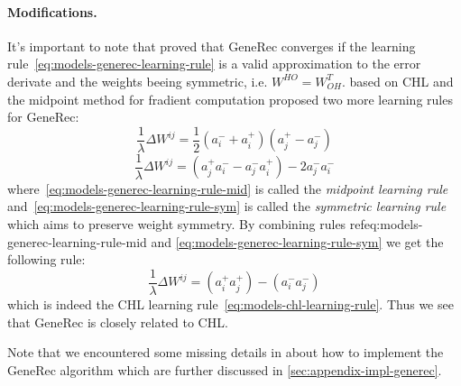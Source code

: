\paragraph{Modifications.}
It's important to note that \citet{o1996bio} proved that GeneRec converges if the learning rule~\ref{eq:models-generec-learning-rule} is a valid approximation to the error derivate and the weights beeing symmetric, i.e. $W^{HO} = W^{T}_{OH}$. \citet{o1996bio} based on CHL and the midpoint method for fradient computation \citep{press1990numerical} proposed two more learning rules for GeneRec: 
\begin{equation}
  \label{eq:models-generec-learning-rule-mid}
  \frac{1}{\lambda} \Delta W^{ij} =  \frac{1}{2}(a^{-}_i + a^{+}_i)(a^{+}_j - a^{-}_j)
\end{equation}
\begin{equation}
  \label{eq:models-generec-learning-rule-sym}
  \frac{1}{\lambda} \Delta W^{ij} =  (a^{+}_j a^{-}_i - a^{-}_j a^{+}_i) - 2a^{-}_j a^{-}_i
\end{equation}
where~\ref{eq:models-generec-learning-rule-mid} is called the \emph{midpoint learning rule} and~\ref{eq:models-generec-learning-rule-sym} is called the \emph{symmetric learning rule} which aims to preserve weight symmetry. By combining rules ref{eq:models-generec-learning-rule-mid} and \ref{eq:models-generec-learning-rule-sym} we get the following rule: 
\begin{equation}
  \label{eq:models-generec-learning-rule-chl}
  \frac{1}{\lambda} \Delta W^{ij} =  (a^{+}_i a^{+}_j) - (a^{-}_i a^{-}_j)
\end{equation}
which is indeed the CHL learning rule~\ref{eq:models-chl-learning-rule}. Thus we see that GeneRec is closely related to CHL. 

Note that we encountered some missing details in \citet{o1996bio} about how to implement the GeneRec algorithm which are further discussed in \ref{sec:appendix-impl-generec}.
